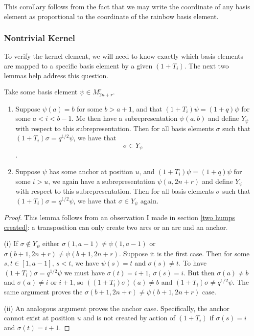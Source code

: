 \documentclass{amsart}
\begin{document}
This corollary follows from the fact that we may write the coordinate of any basis element as proportional to the coordinate of the rainbow basis element.


\subsubsection{Nontrivial Kernel}


To verify the kernel element, we will need to know exactly which basis elements are mapped to a specific basis element by a given $(1+T_i)$. The next two lemmas help address this question.

\begin{lemma}
	Take some basis element $\psi\in M_{2n+r}^r$. 
	
	\begin{enumerate}[label={(\roman*)}]
		
		\item Suppose $\psi(a)=b$ for some $b>a+1$, and that $(1+T_i)\psi=(1+q)\psi$ for some $a<i<b-1$. Me then have a subrepresentation $\psi(a,b)$ and define $Y_\psi$ with respect to this subrepresentation. Then for all basis elements $\sigma$ such that $(1+T_i)\sigma=q^{1/2}\psi$, we have that $$\sigma\in Y_\psi$$.
		
		\item Suppose $\psi$ has some anchor at position $u$, and $(1+T_i)\psi=(1+q)\psi$ for some $i>u$, we again have a subrepresentation $\psi(u,2n+r)$ and define $Y_\psi$ with respect to this subrepresentation. Then for all basis elements $\sigma$ such that $(1+T_i)\sigma=q^{1/2}\psi$, we have that $\sigma\in Y_\psi$ again.
		
		
	\end{enumerate}
	\label{preimage under hump}
\end{lemma}

\begin{proof}
	This lemma follows from an observation I made in section \ref{two humps created}: a transposition can only create two arcs or an arc and an anchor. 
	
	(i) If $\sigma\not\in Y_\psi$ either $\sigma(1,a-1)\not=\psi(1,a-1)$ or $\sigma(b+1,2n+r)\not=\psi(b+1,2n+r)$. Suppose it is the first case. Then for some $s,t\in [1,a-1]$, $s<t$, we have $\psi(s)=t$ and $\sigma(s)\not=t$. To have $(1+T_i)\sigma=q^{1/2}\psi$ we must have $\sigma(t)=i+1$, $\sigma(s)=i$. But then $\sigma(a)\not=b$ and $\sigma(a)\not=i$ or $i+1$, so $((1+T_i)\sigma)(a)\not=b$ and $(1+T_i)\sigma\not=q^{1/2}\psi$. The same argument proves the $\sigma(b+1,2n+r)\not=\psi(b+1,2n+r)$ case. 
	
	(ii) An analogous argument proves the anchor case. Specifically, the anchor cannot exist at position $u$ and is not created by action of $(1+T_i)$ if $\sigma(s)=i$ and $\sigma(t)=i+1$.
	
\end{proof}
\end{document}
